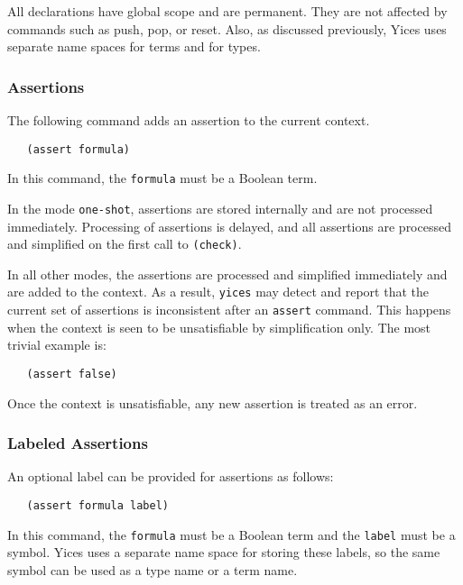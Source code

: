 \documentclass[11pt,twoside,fleqn,openright,titlepage]{cslreport}
\begin{document}
\medskip\noindent
All declarations have global scope and are permanent. They are not
affected by commands such as push, pop, or reset. Also, as discussed
previously, Yices uses separate name spaces for terms and for types.



\subsubsection*{Assertions}

The following command adds an assertion to the current context.
\begin{small}
\begin{verbatim}
   (assert formula)
\end{verbatim}
\end{small}
In this command, the \texttt{formula} must be a Boolean term.

\medskip\noindent
In the mode \texttt{one-shot}, assertions are stored internally and
are not processed immediately. Processing of assertions is delayed,
and all assertions are processed and simplified on the first call to
\texttt{(check)}.

\medskip\noindent
In all other modes, the assertions are processed and simplified
immediately and are added to the context. As a result, \texttt{yices}
may detect and report that the current set of assertions is
inconsistent after an \texttt{assert} command. This happens when the
context is seen to be unsatisfiable by simplification only. The most
trivial example is:
\begin{small}
\begin{verbatim}
   (assert false)
\end{verbatim}
\end{small}
Once the context is unsatisfiable, any new assertion is treated as an
error.


\subsubsection*{Labeled Assertions}

An optional label can be provided for assertions as follows:
\begin{small}
\begin{verbatim}
   (assert formula label)
\end{verbatim}
\end{small}
In this command, the \texttt{formula} must be a Boolean term and the
\texttt{label} must be a symbol. Yices uses a separate name space for
storing these labels, so the same symbol can be used as a type name or
a term name.
\end{document}
